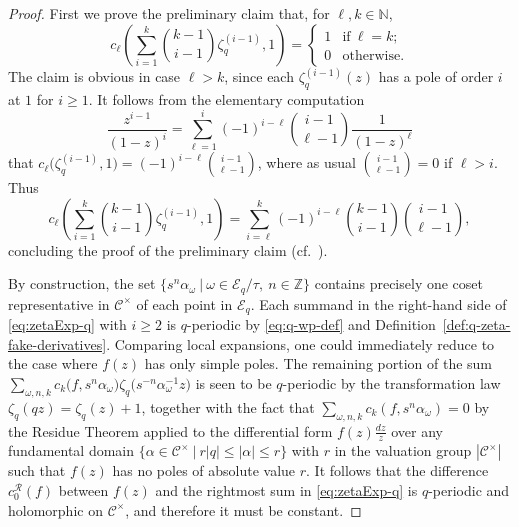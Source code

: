 \documentclass[preprint,12pt]{elsarticle}
\numberwithin{equation}{section} %
\theoremstyle{theorem}
\theoremstyle{definition}
\newcommand{\Cq}{\mathcal{C}} %
\newcommand{\ec}{\mathcal{E}} %
\newcommand{\ecq}{\ec_{q}}
\newcommand{\orbitq}{{\ecq/\tau}} %
\newcommand{\Z}{\mathbb{Z}} %
\newcommand{\zq}{\zeta_{q}}
\newcommand{\zqd}[1]{\zq^{({#1})}} %
\begin{document}
\begin{proof}
     First we prove the preliminary claim that, for $\ell,k\in\mathbb{N}$, \begin{equation}\label{eq:q-zeta-coeffs} c_\ell\left(\sum_{i=1}^k\binom{k-1}{i-1}\zqd{i-1},1\right)=\begin{cases}1 & \text{if} \ \ell=k; \\ 0 & \text{otherwise}.
    \end{cases}\end{equation} The claim is obvious in case $\ell>k$, since each $\zqd{i-1}(z)$ has a pole of order $i$ at $1$ for $i\geq 1$. It follows from the elementary computation \[\frac{z^{i-1}}{(1-z)^i}=\sum_{\ell=1}^{i}(-1)^{i-\ell}\binom{i-1}{\ell-1}\frac{1}{(1-z)^\ell}\] that $c_\ell\bigl(\zqd{i-1},1\bigr)=(-1)^{i-\ell}\binom{i-1}{\ell-1}$, where as usual $\binom{i-1}{\ell-1}=0$ if $\ell>i$. Thus \begin{equation}\label{eq:combo-identity}c_\ell\left(\sum_{i=1}^k\binom{k-1}{i-1}\zqd{i-1},1\right)=\sum_{i=\ell}^k(-1)^{i-\ell}\binom{k-1}{i-1}\binom{i-1}{\ell-1},\end{equation} concluding the proof of the preliminary claim  (cf.~\cite[Lem.~4.27]{Loehr}). 
    
    By construction, the set $\{s^n\alpha_\omega \ | \ \omega\in\orbitq, \ n\in\Z\}$ contains precisely one coset representative in $\Cq^\times$ of each point in $\ecq$. Each summand in the right-hand side of \eqref{eq:zetaExp-q} with $i\geq 2$ is $q$-periodic by \eqref{eq:q-wp-def} and Definition~\ref{def:q-zeta-fake-derivatives}. Comparing local expansions, one could immediately reduce to the case where $f(z)$ has only simple poles. The remaining portion of the sum \mbox{$\sum_{\omega,n,k}c_k\bigl(f,s^n\alpha_\omega\bigr)\zq\bigl(s^{-n}\alpha_\omega^{-1}z\bigr)$} is seen to be $q$-periodic by the transformation law $\zq(qz)=\zq(z)+1$, together with the fact that $\sum_{\omega,n,k}c_k(f,s^n\alpha_\omega)=0$ by the Residue Theorem \cite[Thm.~2.3.3]{RigidAnalyticGeometry} applied to the differential form $f(z)\frac{dz}{z}$ over any fundamental domain $\bigl\{\alpha\in\Cq^\times \ \big| \ r|q|\leq |\alpha| \leq r\bigr\}$ with $r$ in the valuation group $|\Cq^\times|$ such that $f(z)$ has no poles of absolute value $r$. It follows that the difference $c_0^\mathcal{R}(f)$ between $f(z)$ and the rightmost sum in \eqref{eq:zetaExp-q} is $q$-periodic and holomorphic on $\Cq^\times$, and therefore it must be constant.
\end{proof}
\end{document}
